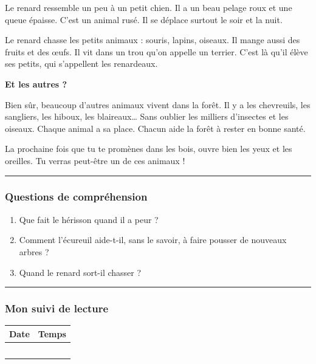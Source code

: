 \documentclass[
  french,
  14pt,
  a4paper,
]{extarticle}
\providecommand{\tightlist}{%
  \setlength{\itemsep}{0pt}\setlength{\parskip}{0pt}}
\begin{document}
Le renard ressemble un peu à un petit chien. Il a un beau pelage roux et
une queue épaisse. C'est un animal rusé. Il se déplace surtout le soir
et la nuit.

Le renard chasse les petits animaux : souris, lapins, oiseaux. Il mange
aussi des fruits et des œufs. Il vit dans un trou qu'on appelle un
terrier. C'est là qu'il élève ses petits, qui s'appellent les
renardeaux.

\textbf{Et les autres ?}

Bien sûr, beaucoup d'autres animaux vivent dans la forêt. Il y a les
chevreuils, les sangliers, les hiboux, les blaireaux\ldots{} Sans
oublier les milliers d'insectes et les oiseaux. Chaque animal a sa
place. Chacun aide la forêt à rester en bonne santé.

La prochaine fois que tu te promènes dans les bois, ouvre bien les yeux
et les oreilles. Tu verras peut-être un de ces animaux !

\begin{center}\rule{0.5\linewidth}{0.5pt}\end{center}

\subsubsection{Questions de
compréhension}\label{questions-de-compruxe9hension-8}

\begin{enumerate}
\def\labelenumi{\arabic{enumi}.}
\tightlist
\item
  Que fait le hérisson quand il a peur ?
\item
  Comment l'écureuil aide-t-il, sans le savoir, à faire pousser de
  nouveaux arbres ?
\item
  Quand le renard sort-il chasser ?
\end{enumerate}

\begin{center}\rule{0.5\linewidth}{0.5pt}\end{center}

\subsubsection{Mon suivi de lecture}\label{mon-suivi-de-lecture-8}

\begin{center}
\begin{tabularx}{0.75\textwidth}{|X|X|}
\hline
\textbf{Date} & \textbf{Temps} \\
\hline
& \\
\hline
& \\
\hline
& \\
\hline
& \\
\hline
& \\
\hline
\end{tabularx}
\end{center}
\end{document}
